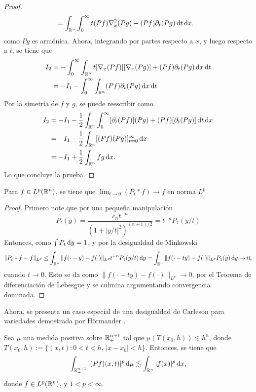\begin{proof}
\begin{align*}
		&= \int_{\mathbb{R}^n}  \int_0^\infty   t(Pf)\nabla^2_x(Pg)-(Pf)\partial_t(Pg)\mathop{}\!\mathrm{d} t \mathop{}\!\mathrm{d} x,
	\end{align*}
	como $Pg$ es armónica. Ahora, integrando por partes respecto a $x$, y luego respecto a $t$, se tiene que
	\begin{align*}
		I_2 & = - \int_0^\infty \int_{\mathbb{R}^n}   t [\nabla_x(Pf)][\nabla_x(Pg)]+(Pf)\partial_t(Pg)\mathop{}\!\mathrm{d} x \mathop{}\!\mathrm{d} t \\
		& = -I_1 - \int_0^\infty \int_{\mathbb{R}^n} (Pf)\partial_t(Pg)\mathop{}\!\mathrm{d} x \mathop{}\!\mathrm{d} t 
	\end{align*}
	Por la simetría de $f$ y $g$, se puede reescribir como 
	\begin{align*}
		I_2 & =  - I_1 -\frac{1}{2}\int_{\mathbb{R}^n}  \int_0^\infty [\partial_t(Pf)](Pg) + (Pf)[\partial_t(Pg)]\mathop{}\!\mathrm{d} t \mathop{}\!\mathrm{d} x \\
		& =  - I_1 -\frac{1}{2}\int_{\mathbb{R}^n} [(Pf)(Pg)]_{t=0}^\infty \mathop{}\!\mathrm{d} x \\
		&= -I_1 + \frac{1}{2}\int_{\mathbb{R}^n}fg\mathop{}\!\mathrm{d} x.
	\end{align*}
	Lo que concluye la prueba.
\end{proof}
\begin{theorem}
	Para $f \in L^p(\mathbb{R}^n)$, se tiene que $\lim_{t\to0}(P_t*f) \to f$ en norma $L^p$
\end{theorem}
\begin{proof}
	Primero note que por una pequeña manipulación
	\begin{equation*}
		P_t(y) = \frac{c_nt^{-n}}{(1+|y/t|^2)^{(n+1)/2}} = t^{-n}P_1(y/t)
	\end{equation*}
	Entonces, como $\int P_t \mathop{}\!\mathrm{d} y = 1$, y por la desigualdad de Minkowski
	\begin{equation*}
		\|P_t*f - f\|_{L^p} \leq \int_{\mathbb{R}^n} \|f(\cdot-y)-f(\cdot)\|_{L^p} t^{-n}P_1(y/t) \mathop{}\!\mathrm{d} y = \int_{\mathbb{R}^n} \|f(\cdot-ty)-f(\cdot)\|_{L^p} P_1(y) \mathop{}\!\mathrm{d} y \to 0,
	\end{equation*}
	cuando $t\to0$. Esto se da como $\|f(\cdot-ty)-f(\cdot)\|_{L^p} \to 0$, por el Teorema de diferenciación de Lebesgue y se culmina argumentando convergencia dominada.
\end{proof}
Ahora, se presenta un caso especial de una desigualdad de Carleson para variedades demostrada por Hörmander \cite{hormander1967}.
\begin{lemma}\label{lem:Carleson}
	Sea $\mu$ una medida positiva sobre $\mathbb{R}^{n+1}_+$ tal que $\mu(T(x_0, h))\lesssim h^n$, donde $T(x_0, h) := \{(x, t): 0<t<h, \, |x-x_0| < h\}$. Entonces, se tiene que 
	\begin{equation*}
		\int_{\mathbb{R}^{n+1}_+} |(Pf)(x, t)|^p \mathop{}\!\mathrm{d} \mu \lesssim \int_{\mathbb{R}^n} |f(x)|^p\mathop{}\!\mathrm{d} x,
	\end{equation*}
	donde $f\in L^p(\mathbb{R}^n)$, y $1<p<\infty$.
\end{lemma}
